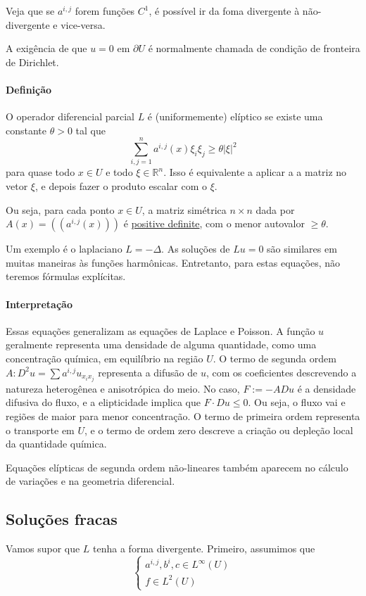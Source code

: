 \documentclass[a4paper, 11pt]{book}
\newcommand{\rn}{{\mathbb{R}^n}}
\newcommand{\pu}{\partial U}
\begin{document}
Veja que se $a^{i,j}$ forem funções $C^1$, é possível ir da foma divergente à não-divergente e vice-versa.

A exigência de que $u=0$ em $\pu$ é normalmente chamada de condição de fronteira de Dirichlet.

\paragraph{Definição} O operador diferencial parcial $L$ é (uniformemente) elíptico se existe uma constante $\theta>0$ tal que \[
	\sum_{i,j=1}^n a^{i,j}(x) \xi_i \xi_j \geq \theta|\xi|^2
\]
para quase todo $x \in U$ e todo $\xi \in \rn$. Isso é equivalente a aplicar a a matriz no vetor $\xi$, e depois fazer o produto escalar com o $\xi$.

Ou seja, para cada ponto $x \in U$, a matriz simétrica $n\times n$ dada por $A(x)= ((a^{i,j}(x)))$ é \href{https://en.wikipedia.org/wiki/Definite_matrix}{positive definite}, com o menor autovalor $\geq \theta$.

Um exemplo é o laplaciano $L=-\Delta$. As soluções de $Lu=0$ são similares em muitas maneiras às funções harmônicas. Entretanto, para estas equações, não teremos fórmulas explícitas.

\paragraph{Interpretação} Essas equações generalizam as equações de Laplace e Poisson. A função $u$ geralmente representa uma densidade de alguma quantidade, como uma concentração química, em equilíbrio na região $U$. O termo de segunda ordem $A: D^2u = \sum a^{i,j}u_{x_ix_j}$ representa a difusão de $u$, com os coeficientes descrevendo a natureza heterogênea e anisotrópica do meio. No caso, $F := - ADu$ é a densidade difusiva do fluxo, e a elipticidade implica que $F \cdot Du \leq 0$. Ou seja, o fluxo vai e regiões de maior para menor concentração. O termo de primeira ordem representa o transporte em $U$, e o termo de ordem zero descreve a criação ou depleção local da quantidade química.

Equações elípticas de segunda ordem não-lineares também aparecem no cálculo de variações e na geometria diferencial.

\subsection{Soluções fracas}

Vamos supor que $L$ tenha a forma divergente. Primeiro, assumimos que \[
\begin{cases}
	a^{i,j}, b^i, c \in L^\infty(U) \\
	f \in L^2(U)
\end{cases}	
\]
\end{document}
